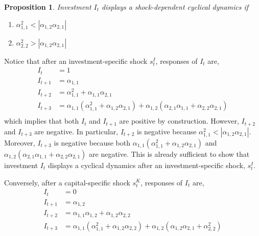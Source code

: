 \documentclass{article}
\newtheorem{prop}{Proposition}
\newenvironment{proof}[1][Proof]{\begin{trivlist}
\item[\hskip \labelsep {\bfseries #1}]}{\end{trivlist}}
\begin{document}
\begin{prop}
Investment $I_t$ displays a shock-dependent cyclical dynamics if
\begin{enumerate}
	\item $\alpha_{1,1}^2 < |\alpha_{1,2} \alpha_{2,1}|$
	\item $\alpha_{2,2}^2 > |\alpha_{1,2} \alpha_{2,1}|$
\end{enumerate}
\end{prop}

\begin{proof}
Notice that after an investment-specific shock $s_t^I$, responses of $I_t$ are,
\begin{equation*}
\begin{aligned}
I_t     &= 1   \\
I_{t+1} &= \alpha_{1,1}   \\ 
I_{t+2} &=  \alpha_{1,1}^2 + \alpha_{1,1} \alpha_{2,1}  \\ 
I_{t+3} &=  \alpha_{1,1}(\alpha_{1,1}^2 + \alpha_{1,2}\alpha_{2,1}) + \alpha_{1,2}(\alpha_{2,1}\alpha_{1,1} + \alpha_{2,2}\alpha_{2,1})  \\ 
\end{aligned}
\end{equation*}	
which implies that both $I_t$ and $I_{t+1}$ are positive by construction. However, $I_{t+2}$ and $I_{t+3}$ are negative. In particular, $I_{t+2}$ is negative because $\alpha_{1,1}^2 < |\alpha_{1,2} \alpha_{2,1}|$. Moreover, $I_{t+3}$ is negative because both $\alpha_{1,1}(\alpha_{1,1}^2 + \alpha_{1,2}\alpha_{2,1})$ and $\alpha_{1,2}(\alpha_{2,1}\alpha_{1,1} + \alpha_{2,2}\alpha_{2,1})$ are negative. This is already sufficient to show that investment $I_t$ displays a cyclical dynamics after an investment-specific shock, $s_t^I$.

Conversely, after a capital-specific shock $s_t^K$, responses of $I_t$ are,
\begin{equation*}
\begin{aligned}
I_t     &= 0   \\
I_{t+1} &= \alpha_{1,2}   \\ 
I_{t+2} &=  \alpha_{1,1} \alpha_{1,2} + \alpha_{1,2} \alpha_{2,2}  \\ 
I_{t+3} &=  \alpha_{1,1}(\alpha_{1,1}^2 + \alpha_{1,2}\alpha_{2,2}) + \alpha_{1,2}(\alpha_{1,2}\alpha_{2,1} + \alpha_{2,2}^2)  \\ 
\end{aligned}
\end{equation*}	
\end{proof}
\end{document}
